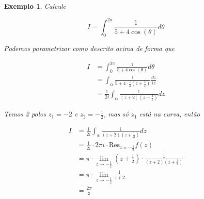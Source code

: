 \documentclass{article}
\newtheorem{ex}{Exemplo}
\begin{document}
\begin{ex}
Calcule

\begin{equation*}
    I = \int_0^{2 \pi} \frac{1}{5 + 4 \cos(\theta)} d \theta
\end{equation*}

Podemos parametrizar como descrito acima de forma que

\begin{align*}
    I &= \int_0^{2 \pi} \frac{1}{5 + 4 \cos(\theta)} d \theta \\
    &= \int_\alpha \frac{1}{5 + 4 \cdot \frac{1}{2} (z + \frac{1}{z})} \frac{d z}{i z} \\
    &= \frac{1}{2 i} \int_\alpha \frac{1}{(z + 2) (z + \frac{1}{2})} d z
\end{align*}

Temos 2 polos $z_1 = -2$ e $z_2 = - \frac{1}{2}$, mas só $z_1$ está na curva, então

\begin{align*}
    I &= \frac{1}{2 i} \int_\alpha \frac{1}{(z + 2) (z + \frac{1}{2})} d z \\
    &= \frac{1}{2 i} \cdot 2 \pi i \cdot \mathrm{Res}_{z = - \frac{1}{2}} f(z) \\
    &= \pi \cdot \lim_{z \to - \frac{1}{2}} \left(z + \frac{1}{2} \right) \cdot \frac{1}{(z + 2) (z + \frac{1}{2})} \\
    &= \pi \cdot \lim_{z \to - \frac{1}{2}} \frac{1}{z + 2} \\
    &= \frac{2 \pi}{3}
\end{align*}
\end{ex}
\end{document}

